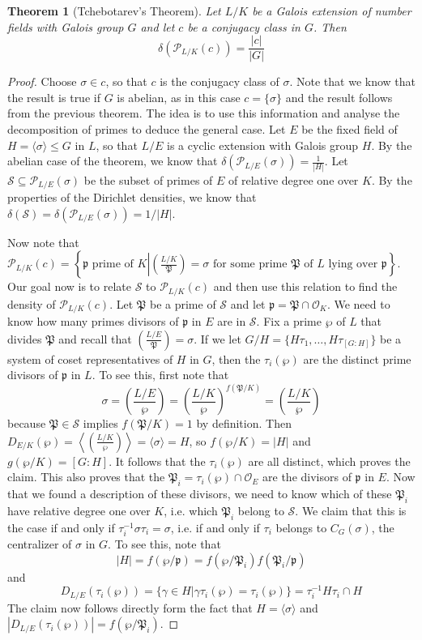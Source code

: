 \documentclass[]{amsart}
\newtheorem{theorem}{Theorem}
\renewcommand{\S}{\mathcal{S}}
\newcommand{\OK}{\mathcal{O}_K}
\newcommand{\p}{\mathfrak{p}}
\renewcommand{\P}{\mathfrak{P}}
\newcommand{\PP}{\mathcal{P}}
\newcommand{\Frob}[2]{\left(\frac{#1}{#2}\right )}
\begin{document}
		\begin{theorem}[Tchebotarev's Theorem]
			Let $L/K$ be a Galois extension of number fields with Galois group $G$ and let $c$ be a conjugacy class in $G$. Then
			\[\delta(\PP_{L/K}(c))=\frac{|c|}{|G|}\]
		\end{theorem}
		\begin{proof}
			Choose $\sigma\in c$, so that $c$ is the conjugacy class of $\sigma$.
			Note that we know that the result is true if $G$ is abelian, as in this case $c=\{\sigma\}$ and the result follows from the previous theorem. The idea is to use this information and analyse the decomposition of primes to deduce the general case. Let $E$ be the fixed field of $H=\langle\sigma\rangle\leq G$ in $L$, so that $L/E$ is a cyclic extension with Galois group $H$. By the abelian case of the theorem, we know that $\delta(\PP_{L/E}(\sigma))=\frac{1}{|H|}$. Let $\S\subseteq\PP_{L/E}(\sigma)$ be the subset of primes of $E$ of relative degree one over $K$. By the properties of the Dirichlet densities, we know that $\delta(\S)=\delta(\PP_{L/E}(\sigma))=1/|H|$.
			
			Now note that $\PP_{L/K}(c)=\left \{\p\text{ prime of }K\left |\Frob{L/K}{\P}=\sigma\text{ for some prime }\P\text{ of }L\text{ lying over }\p\right .\right \}$. Our goal now is to relate $\S$ to $\PP_{L/K}(c)$ and then use this relation to find the density of $\PP_{L/K}(c)$. Let $\P$ be a prime of $\S$ and let $\p=\P\cap\OK$. We need to know how many primes divisors of $\p$ in $E$ are in $\S$. Fix a prime $\wp$ of $L$ that divides $\P$ and recall that $\Frob{L/E}{\P}=\sigma$. If we let $G/H=\{H\tau_1,\dots,H\tau_{[G:H]}\}$ be a system of coset representatives of $H$ in $G$, then the $\tau_i(\wp)$ are the distinct prime divisors of $\p$ in $L$. To see this, first note that
			\[\sigma=\Frob{L/E}{\wp}=\Frob{L/K}{\wp}^{f(\P/K)}=\Frob{L/K}{\wp}\]
			because $\P\in\S$ implies $f(\P/K)=1$ by definition. Then $D_{E/K}(\wp)=\left \langle\Frob{L/K}{\wp}\right \rangle=\langle\sigma\rangle=H$, so $f(\wp/K)=|H|$ and $g(\wp/K)=[G:H]$. It follows that the $\tau_i(\wp)$ are all distinct, which proves the claim. This also proves that the $\P_i=\tau_i(\wp)\cap\mathcal{O}_E$ are the divisors of $\p$ in $E$. Now that we found a description of these divisors, we need to know which of these $\P_i$ have relative degree one over $K$, i.e. which $\P_i$ belong to $\S$. We claim that this is the case if and only if $\tau_i^{-1}\sigma\tau_i=\sigma$, i.e. if and only if $\tau_i$ belongs to $C_G(\sigma)$, the centralizer of $\sigma$ in $G$. To see this, note that
			\[|H|=f(\wp/\p)=f(\wp/\P_i)f(\P_i/\p)\]
			and 
			\[D_{L/E}(\tau_i(\wp))=\{\gamma\in H|\gamma\tau_i(\wp)=\tau_i(\wp)\}=\tau_i^{-1}H\tau_i\cap H\]
			The claim now follows directly form the fact that $H=\langle\sigma\rangle$ and $|D_{L/E}(\tau_i(\wp))|=f(\wp/\P_i)$. 
			

\end{proof}
\end{document}
